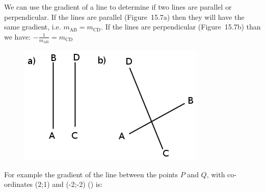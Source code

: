         \label{m39108*eip-332}We can use the gradient of a line to determine if two lines are parallel or perpendicular. If the lines are parallel (Figure~15.7a) then they will have the same gradient, i.e. \begin{math}{m}_{\mathrm{AB}}={m}_{\mathrm{CD}}\end{math}. If the lines are perpendicular (Figure~15.7b) than we have: \begin{math}-\frac{1}{{m}_{\mathrm{AB}}}={m}_{\mathrm{CD}}\end{math}
    \setcounter{subfigure}{0}
	\begin{figure}[H] %
    \begin{center}
    \label{m39108*uid4212!!!underscore!!!media}\label{m39108*uid4212!!!underscore!!!printimage}\includegraphics[width=0.4\columnwidth]{col11306.imgs/m39108_geom.png} %
      \vspace{2pt}
    \vspace{.1in}
    \end{center}
 \end{figure}       
\par \label{m39108*id68198}For example the gradient of the line between the points \begin{math}P\end{math} and \begin{math}Q\end{math}, with co-ordinates (2;1) and (-2;-2) () is:\par 
        \label{m39108*id68224}\nopagebreak\noindent{}
